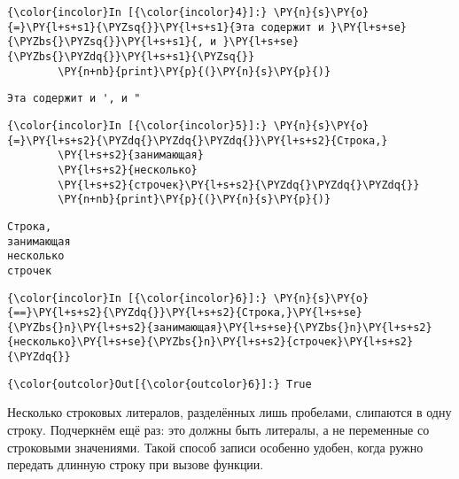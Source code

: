     \begin{Verbatim}[commandchars=\\\{\}]
{\color{incolor}In [{\color{incolor}4}]:} \PY{n}{s}\PY{o}{=}\PY{l+s+s1}{\PYZsq{}}\PY{l+s+s1}{Эта содержит и }\PY{l+s+se}{\PYZbs{}\PYZsq{}}\PY{l+s+s1}{, и }\PY{l+s+se}{\PYZbs{}\PYZdq{}}\PY{l+s+s1}{\PYZsq{}}
        \PY{n+nb}{print}\PY{p}{(}\PY{n}{s}\PY{p}{)}
\end{Verbatim}

    \begin{Verbatim}[commandchars=\\\{\}]
Эта содержит и ', и "

    \end{Verbatim}

    \begin{Verbatim}[commandchars=\\\{\}]
{\color{incolor}In [{\color{incolor}5}]:} \PY{n}{s}\PY{o}{=}\PY{l+s+s2}{\PYZdq{}\PYZdq{}\PYZdq{}}\PY{l+s+s2}{Строка,}
        \PY{l+s+s2}{занимающая}
        \PY{l+s+s2}{несколько}
        \PY{l+s+s2}{строчек}\PY{l+s+s2}{\PYZdq{}\PYZdq{}\PYZdq{}}
        \PY{n+nb}{print}\PY{p}{(}\PY{n}{s}\PY{p}{)}
\end{Verbatim}

    \begin{Verbatim}[commandchars=\\\{\}]
Строка,
занимающая
несколько
строчек

    \end{Verbatim}

    \begin{Verbatim}[commandchars=\\\{\}]
{\color{incolor}In [{\color{incolor}6}]:} \PY{n}{s}\PY{o}{==}\PY{l+s+s2}{\PYZdq{}}\PY{l+s+s2}{Строка,}\PY{l+s+se}{\PYZbs{}n}\PY{l+s+s2}{занимающая}\PY{l+s+se}{\PYZbs{}n}\PY{l+s+s2}{несколько}\PY{l+s+se}{\PYZbs{}n}\PY{l+s+s2}{строчек}\PY{l+s+s2}{\PYZdq{}}
\end{Verbatim}

            \begin{Verbatim}[commandchars=\\\{\}]
{\color{outcolor}Out[{\color{outcolor}6}]:} True
\end{Verbatim}
        
    Несколько строковых литералов, разделённых лишь пробелами, слипаются в
одну строку. Подчеркнём ещё раз: это должны быть литералы, а не
переменные со строковыми значениями. Такой способ записи особенно
удобен, когда ружно передать длинную строку при вызове функции.


